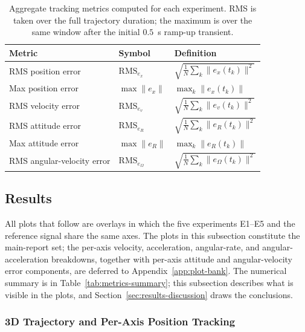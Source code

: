 \documentclass[11pt]{article}
\theoremstyle{remark}
\begin{document}
\begin{table}[H]
    \centering
    \caption{Aggregate tracking metrics computed for each experiment. RMS is taken over the full trajectory duration; the maximum is over the same window after the initial $0.5$~s ramp-up transient.}
    \label{tab:metrics}
    \begin{tabular}{lll}
        \toprule
        Metric & Symbol & Definition \\
        \midrule
        RMS position error           & $\mathrm{RMS}_{e_x}$        & $\sqrt{\tfrac{1}{N}\sum_k \|e_x(t_k)\|^2}$ \\
        Max position error           & $\max\|e_x\|$               & $\max_k \|e_x(t_k)\|$ \\
        RMS velocity error           & $\mathrm{RMS}_{e_v}$        & $\sqrt{\tfrac{1}{N}\sum_k \|e_v(t_k)\|^2}$ \\
        RMS attitude error           & $\mathrm{RMS}_{e_R}$        & $\sqrt{\tfrac{1}{N}\sum_k \|e_R(t_k)\|^2}$ \\
        Max attitude error           & $\max\|e_R\|$               & $\max_k \|e_R(t_k)\|$ \\
        RMS angular-velocity error   & $\mathrm{RMS}_{e_\Omega}$   & $\sqrt{\tfrac{1}{N}\sum_k \|e_\Omega(t_k)\|^2}$ \\
        \bottomrule
    \end{tabular}
\end{table}

\subsection{Results}
\label{sec:results-overlays}

All plots that follow are overlays in which the five experiments E1--E5 and the reference signal share the same axes. The plots in this subsection constitute the main-report set; the per-axis velocity, acceleration, angular-rate, and angular-acceleration breakdowns, together with per-axis attitude and angular-velocity error components, are deferred to Appendix~\ref{app:plot-bank}. The numerical summary is in Table~\ref{tab:metrics-summary}; this subsection describes what is visible in the plots, and Section~\ref{sec:results-discussion} draws the conclusions.

\subsubsection{3D Trajectory and Per-Axis Position Tracking}
\end{document}
